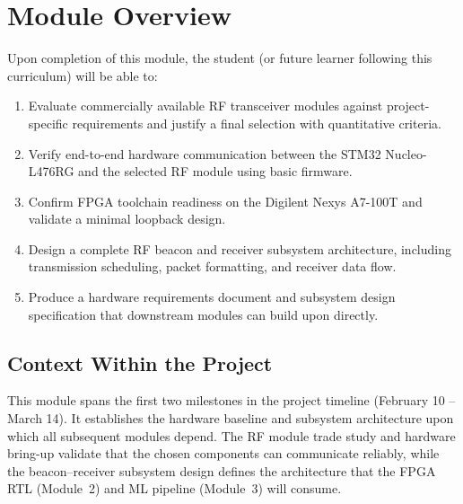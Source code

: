 \documentclass[11pt,letterpaper]{article}
\begin{document}
	\tableofcontents
	\newpage
	
	\section{Module Overview}
	
	\begin{tcolorbox}[objective={Module 1 Learning Objectives}]
		Upon completion of this module, the student (or future learner following this curriculum) will be able to:
		\begin{enumerate}[label=\textbf{LO-\arabic*}]
			\item Evaluate commercially available RF transceiver modules against project-specific requirements and justify a final selection with quantitative criteria.
			\item Verify end-to-end hardware communication between the STM32 Nucleo-L476RG and the selected RF module using basic firmware.
			\item Confirm FPGA toolchain readiness on the Digilent Nexys A7-100T and validate a minimal loopback design.
			\item Design a complete RF beacon and receiver subsystem architecture, including transmission scheduling, packet formatting, and receiver data flow.
			\item Produce a hardware requirements document and subsystem design specification that downstream modules can build upon directly.
		\end{enumerate}
	\end{tcolorbox}
	
	\subsection{Context Within the Project}
	
	This module spans the first two milestones in the project timeline (February 10 -- March 14). It establishes the hardware baseline and subsystem architecture upon which all subsequent modules depend. The RF module trade study and hardware bring-up validate that the chosen components can communicate reliably, while the beacon--receiver subsystem design defines the architecture that the FPGA RTL (Module~2) and ML pipeline (Module~3) will consume.
	
\end{document}
